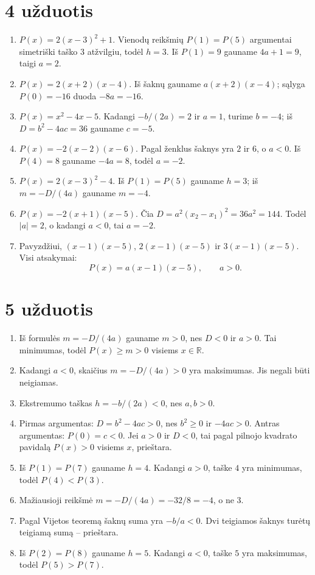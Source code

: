 \documentclass[11pt,a4paper]{article}
\newcommand{\R}{\mathbb{R}}
\begin{document}
\section*{4 užduotis}
\begin{enumerate}
\item $P(x)=2(x-3)^2+1$.
 Vienodų reikšmių $P(1)=P(5)$ argumentai simetriški taško $3$ atžvilgiu,
 todėl $h=3$. Iš $P(1)=9$ gauname $4a+1=9$, taigi $a=2$.
\item $P(x)=2(x+2)(x-4)$.
 Iš šaknų gauname $a(x+2)(x-4)$; sąlyga $P(0)=-16$ duoda $-8a=-16$.
\item $P(x)=x^2-4x-5$.
 Kadangi $-b/(2a)=2$ ir $a=1$, turime $b=-4$;
 iš $D=b^2-4ac=36$ gauname $c=-5$.
\item $P(x)=-2(x-2)(x-6)$.
 Pagal ženklus šaknys yra $2$ ir $6$, o $a<0$.
 Iš $P(4)=8$ gauname $-4a=8$, todėl $a=-2$.
\item $P(x)=2(x-3)^2-4$.
 Iš $P(1)=P(5)$ gauname $h=3$;
 iš $m=-D/(4a)$ gauname $m=-4$.
\item $P(x)=-2(x+1)(x-5)$.
 Čia $D=a^2(x_2-x_1)^2=36a^2=144$.
 Todėl $|a|=2$, o kadangi $a<0$, tai $a=-2$.
\item Pavyzdžiui, $(x-1)(x-5)$, $2(x-1)(x-5)$ ir
 $3(x-1)(x-5)$. Visi atsakymai:
 \[
 P(x)=a(x-1)(x-5),\qquad a>0.
 \]
\end{enumerate}

\section*{5 užduotis}
\begin{enumerate}
\item Iš formulės $m=-D/(4a)$ gauname $m>0$, nes $D<0$ ir $a>0$.
 Tai minimumas, todėl $P(x)\ge m>0$ visiems $x\in\R$.
\item Kadangi $a<0$, skaičius $m=-D/(4a)>0$ yra maksimumas.
 Jis negali būti neigiamas.
\item Ekstremumo taškas $h=-b/(2a)<0$, nes $a,b>0$.
\item Pirmas argumentas: $D=b^2-4ac>0$, nes $b^2\ge0$ ir $-4ac>0$.
 Antras argumentas: $P(0)=c<0$. Jei $a>0$ ir $D<0$,
 tai pagal pilnojo kvadrato pavidalą $P(x)>0$ visiems $x$, prieštara.
\item Iš $P(1)=P(7)$ gauname $h=4$.
 Kadangi $a>0$, taške $4$ yra minimumas, todėl $P(4)<P(3)$.
\item Mažiausioji reikšmė $m=-D/(4a)=-32/8=-4$, o ne $3$.
\item Pagal Vijetos teoremą šaknų suma yra $-b/a<0$.
 Dvi teigiamos šaknys turėtų teigiamą sumą -- prieštara.
\item Iš $P(2)=P(8)$ gauname $h=5$.
 Kadangi $a<0$, taške $5$ yra maksimumas, todėl $P(5)>P(7)$.
\end{enumerate}
\end{document}
